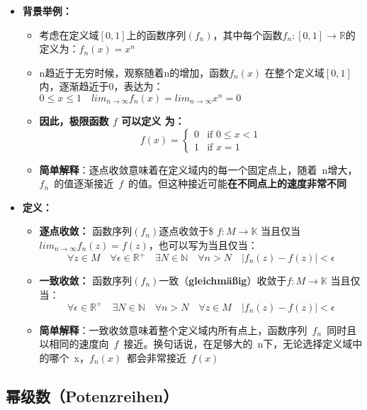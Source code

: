 \documentclass[a4paper,12pt]{article}
\providecommand{\tightlist}{\setlength{\itemsep}{0pt}\setlength{\parskip}{0pt}}
\begin{document}
\begin{itemize}
\item
  \textbf{背景举例：}

  \begin{itemize}
  \tightlist
  \item
    考虑在定义域\([0,1]\)上的函数序列\((f_n)\)，其中每个函数\(f_n:[0,1] \to \mathbb{R}\)的定义为：\(f_n(x) = x^n\)
  \item
    n趋近于无穷时候，观察随着n的增加，函数\(f_n(x)\)
    在整个定义域\([0,1]\)内，逐渐趋近于0，表达为：
    \(0 \leq x \leq 1 \quad lim_{n \to \infty}f_n(x) = lim_{n \to \infty}x^n = 0\)
  \item
    \textbf{因此，极限函数 \(f\) 可以定义 为：} \[f(x) = \begin{cases} 
      0 & \text{if } 0 \leq x < 1 \\
      1 & \text{if } x = 1
      \end{cases}\]
  \item
    \textbf{简单解释}：逐点收敛意味着在定义域内的每一个固定点上，随着~n增大，\(f_n\)\hspace{0pt}~的值逐渐接近~\(f\)~的值。但这种接近可能\textbf{在不同点上的速度非常不同}
  \end{itemize}
\item
  \textbf{定义：}

  \begin{itemize}
  \tightlist
  \item
    \textbf{逐点收敛：} 函数序列\((f_n)\)逐点收敛于\$
    \(f: M \to \mathbb{K}\) 当且仅当
    \(lim_{n \to \infty}f_n(z) = f(z)\)，也可以写为当且仅当： \[
      \forall z \in M\quad\forall \epsilon \in \mathbb{R}^+\quad\exists N \in \mathbb{N}\quad\forall n > N\quad|f_n(z) - f(z)| < \epsilon
      \]
  \item
    \textbf{一致收敛：}
    函数序列\((f_n)\)一致（\textbf{gleichmäßig}）收敛于\(f: M \to \mathbb{K}\)
    当且仅当： \[
      \forall \epsilon \in \mathbb{R}^+\quad\exists N \in \mathbb{N}\quad\forall n > N\quad\forall z \in M\quad|f_n(z) - f(z)| < \epsilon
      \]
  \item
    \textbf{简单解释}：一致收敛意味着整个定义域内所有点上，函数序列~\(f_n\)\hspace{0pt}~同时且以相同的速度向~\(f\)~接近。换句话说，在足够大的~n下，无论选择定义域中的哪个~x，\(f_n(x)\)~都会非常接近~\(f(x)\)
  \end{itemize}
\end{itemize}

\subsection{幂级数（Potenzreihen）}\label{ux5e42ux7ea7ux6570potenzreihen}
\end{document}
